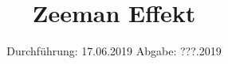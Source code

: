 

\subject{Versuch 27}
\title{Zeeman Effekt}
\date{%
  Durchführung: 17.06.2019
  \hspace{3em}
  Abgabe: ???.2019
}



\maketitle
\thispagestyle{empty}
\tableofcontents
\newpage






\printbibliography{}


